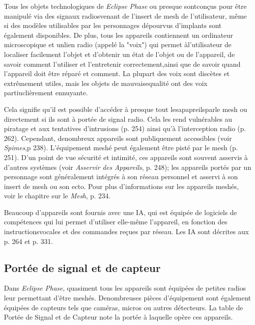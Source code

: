 Tous les objets technologiques de \emph{Eclipse Phase} ou presque sontconçus pour être manipulé via des signaux radiosvenant de l'insert de mesh de l'utilisateur, même si des modèles utilisables par les personnages dépourvus d'implants sont également disponibles. De plus, tous les appareils contiennent un ordinateur microscopique et unlien radio (appelé la "voix") qui permet àl'utilisateur de localiser facilement l'objet et d'obtenir un état de l'objet ou de l'appareil, de savoir comment l'utiliser et l'entretenir correctement,ainsi que de savoir quand l'appareil doit être réparé et comment. La plupart des voix sont discètes et extrêmement utiles, mais les objets de mauvaisequalité ont des voix partiuclièrement ennuyante. 

Cela signifie qu'il est possible d'accéder à presque tout lesapapreilsparle mesh ou directement si ils sont à portée de signal radio. Cela les rend vulnérables au piratage et aux tentatives d'intrusions (p. 254) ainsi qu'à l'interception radio (p. 262). Cependant, denombreux appareils sont publiquement accessibles (voir \emph{Spimes},p 238). L'équipement meshé peut également être pisté par le mesh (p. 251). D'un point de vue sécurité et intimité, ces appareils sont souvent asservis à d'autres systèmes (voir \emph{Asservir des Appareils}, p. 248); les appareils portés par un personnage sont généralement intégrés à son réseau personnel et asservi à son insert de mesh ou son ecto. Pour plus d'informations sur les appareils meshés, voir le chapitre sur le \emph{Mesh}, p. 234. 

Beaucoup d'appareils sont fournis avec une IA, qui est équipée de logiciels de compétences qui lui permet d'utiliser elle-même l'appareil, en fonction des instructionsvocales et des commandes reçues par réseau. Les IA sont décrites aux p. 264 et p. 331. 

\subsection{Portée de signal et de capteur} \label{sec:radio-sensor-ranges} 

Dans \emph{Eclipse Phase}, quasiment tous les appareils sont équipées de petites radios leur permettant d'être meshés. Denombreuses pièces d'équipement sont également équipées de capteurs tels que caméras, micros ou autres détecteurs. La table de Portée de Signal et de Capteur note la portée à laquelle opère ces appareils. 


